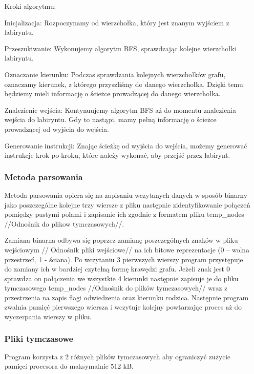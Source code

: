 \documentclass[
]{article}
\begin{document}
Kroki algorytmu:

Inicjalizacja: Rozpoczynamy od wierzchołka, który jest znanym wyjściem z
labiryntu.

Przeszukiwanie: Wykonujemy algorytm BFS, sprawdzając kolejne wierzchołki
labiryntu.

Oznaczanie kierunku: Podczas sprawdzania kolejnych wierzchołków grafu,
oznaczamy kierunek, z którego przyszliśmy do danego wierzchołka. Dzięki
temu będziemy mieli informację o ścieżce prowadzącej do danego
wierzchołka.

Znalezienie wejścia: Kontynuujemy algorytm BFS aż do momentu znalezienia
wejścia do labiryntu. Gdy to nastąpi, mamy pełną informację o ścieżce
prowadzącej od wyjścia do wejścia.

Generowanie instrukcji: Znając ścieżkę od wyjścia do wejścia, możemy
generować instrukcje krok po kroku, które należy wykonać, aby przejść
przez labirynt.

\hypertarget{metoda-parsowania}{%
\subsubsection{Metoda parsowania}\label{metoda-parsowania}}

Metoda parsowania opiera się na zapisaniu wczytanych danych w sposób
binarny jako poszczególne kolejne trzy wiersze z pliku następnie
zidentyfikowanie połączeń pomiędzy pustymi polami i zapisanie ich
zgodnie z formatem pliku temp\_nodes //Odnośnik do plikow
tymczasowych//.

Zamiana binarna odbywa się poprzez zamianę poszczególnych znaków w pliku
wejściowym // Odnośnik pliki wejściowe// na ich bitowe reprezentacje (0
-- wolna przestrzeń, 1 - ściana). Po wczytaniu 3 pierwszych wierszy
program przystępuje do zamiany ich w bardziej czytelną formę krawędzi
grafu. Jeżeli znak jest 0 sprawdza on połączenia we wszystkie 4 kierunki
następnie zapisuje je do pliku tymczasowego temp\_nodes //Odnośnik do
plików tymczasowych// wraz z przestrzenia na zapis flagi odwiedzenia
oraz kierunku rodzica. Następnie program zwalnia pamięć pierwszego
wiersza i wczytuje kolejny powtarzając proces aż do wyczerpania wierszy
w pliku.

\hypertarget{pliki-tymczasowe}{%
\subsubsection{Pliki tymczasowe}\label{pliki-tymczasowe}}

Program korzysta z 2 różnych plików tymczasowych aby ograniczyć zużycie
pamięci procesora do maksymalnie 512 kB.
\end{document}
